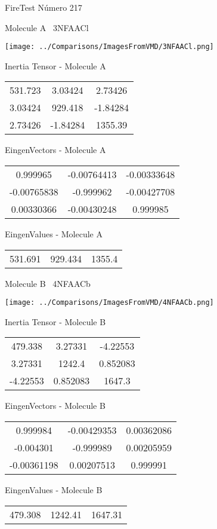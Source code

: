 \vtab[-3cm]
\begin{center}
{\large FireTest \tab Número 217}
\end{center}
\begin{multicols}{2}
\begin{center}

Molecule A \
3NFAACl

\texttt{[image: ../Comparisons/ImagesFromVMD/3NFAACl.png]}

Inertia Tensor - Molecule A \\
\begin{tabular}{|c c c|}
531.723	 & 	3.03424	 & 	2.73426	 \\
3.03424	 & 	929.418	 & 	-1.84284	 \\
2.73426	 & 	-1.84284	 & 	1355.39
\end{tabular}

\vtab
 EingenVectors - Molecule A     \\
\begin{tabular}{|c c c|}
0.999965	 & 	-0.00764413	 & 	-0.00333648	 \\
-0.00765838	 & 	-0.999962	 & 	-0.00427708	 \\
0.00330366	 & 	-0.00430248	 & 	0.999985
\end{tabular}

\vtab
 EingenValues - Molecule A     \\
\begin{tabular}{|c c c|}
531.691	 & 	929.434	 & 	1355.4	 \\
\end{tabular}
\columnbreak

Molecule B \
4NFAACb

\texttt{[image: ../Comparisons/ImagesFromVMD/4NFAACb.png]}

Inertia Tensor - Molecule B \\
\begin{tabular}{|c c c|}
479.338	 & 	3.27331	 & 	-4.22553	 \\
3.27331	 & 	1242.4	 & 	0.852083	 \\
-4.22553	 & 	0.852083	 & 	1647.3
\end{tabular}

\vtab
 EingenVectors - Molecule B     \\
\begin{tabular}{|c c c|}
0.999984	 & 	-0.00429353	 & 	0.00362086	 \\
-0.004301	 & 	-0.999989	 & 	0.00205959	 \\
-0.00361198	 & 	0.00207513	 & 	0.999991
\end{tabular}

\vtab
 EingenValues - Molecule B     \\
\begin{tabular}{|c c c|}
479.308	 & 	1242.41	 & 	1647.31	 \\
\end{tabular}

\end{center}
\end{multicols}

